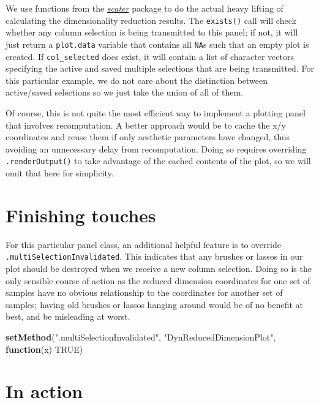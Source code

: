 \documentclass[
]{book}
\newenvironment{Shaded}{\begin{snugshade}}{\end{snugshade}}
\newcommand{\ControlFlowTok}[1]{\textcolor[rgb]{0.13,0.29,0.53}{\textbf{#1}}}
\newcommand{\KeywordTok}[1]{\textcolor[rgb]{0.13,0.29,0.53}{\textbf{#1}}}
\newcommand{\NormalTok}[1]{#1}
\newcommand{\OtherTok}[1]{\textcolor[rgb]{0.56,0.35,0.01}{#1}}
\newcommand{\StringTok}[1]{\textcolor[rgb]{0.31,0.60,0.02}{#1}}
\begin{document}
We use functions from the \emph{\href{https://bioconductor.org/packages/3.11/scater}{scater}} package to do the actual heavy lifting of calculating the dimensionality reduction results.
The \texttt{exists()} call will check whether any column selection is being transmitted to this panel; if not, it will just return a \texttt{plot.data} variable that contains all \texttt{NA}s such that an empty plot is created.
If \texttt{col\_selected} does exist, it will contain a list of character vectors specifying the active and saved multiple selections that are being transmitted.
For this particular example, we do not care about the distinction between active/saved selections so we just take the union of all of them.

Of course, this is not quite the most efficient way to implement a plotting panel that involves recomputation.
A better approach would be to cache the x/y coordinates and reuse them if only aesthetic parameters have changed,
thus avoiding an unnecessary delay from recomputation.
Doing so requires overriding \texttt{.renderOutput()} to take advantage of the cached contents of the plot,
so we will omit that here for simplicity.

\hypertarget{finishing-touches}{%
\section{Finishing touches}\label{finishing-touches}}

For this particular panel class, an additional helpful feature is to override \texttt{.multiSelectionInvalidated}.
This indicates that any brushes or lassos in our plot should be destroyed when we receive a new column selection.
Doing so is the only sensible course of action as the reduced dimension coordinates for one set of samples have no obvious relationship to the coordinates for another set of samples;
having old brushes or lassos hanging around would be of no benefit at best, and be misleading at worst.

\begin{Shaded}
\begin{Highlighting}[]
\KeywordTok{setMethod}\NormalTok{(}\StringTok{".multiSelectionInvalidated"}\NormalTok{, }\StringTok{"DynReducedDimensionPlot"}\NormalTok{, }\ControlFlowTok{function}\NormalTok{(x) }\OtherTok{TRUE}\NormalTok{)}
\end{Highlighting}
\end{Shaded}

\hypertarget{in-action}{%
\section{In action}\label{in-action}}
\end{document}
